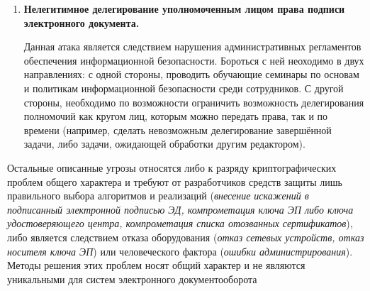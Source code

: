 \begin{enumerate} [label=\textbf{\arabic*}. ]
	\vspace{\baselineskip}
	В ещё более надёжной системе можно использовать асимметричные ключи, записанные на токены \cite{gpghowto, rutoken}. Такие ключи неизвлекаемы, для доступа к ним требуется физический доступ к их носителю --- токен злоумышленнику придётся украсть, а обнаружить пропажу физического ключа проще, чем электронного.

	\item \textbf{Нелегитимное делегирование уполномоченным лицом права подписи электронного документа.}

	\nopagebreak
	Данная атака является следствием нарушения административных регламентов обеспечения информационной безопасности. Бороться с ней неоходимо в двух направлениях: с одной стороны, проводить обучающие семинары по основам и политикам информационной безопасности среди сотрудников. С другой стороны, необходимо по возможности ограничить возможность делегирования полномочий как кругом лиц, которым можно передать права, так и по времени (например, сделать невозможным делегирование завершённой задачи, либо задачи, ожидающей обработки другим редактором).
\end{enumerate}

\vspace{\baselineskip}
Остальные описанные угрозы относятся либо к разряду криптографических проблем общего характера и требуют от разработчиков средств защиты лишь правильного выбора алгоритмов и реализаций (\textit{внесение искажений в подписанный электронной подписью ЭД, компрометация ключа ЭП либо ключа удостоверяющего центра, компрометация списка отозванных сертификатов}), либо является следствием отказа оборудования (\textit{отказ сетевых устройств, отказ носителя ключа ЭП}) или человеческого фактора (\textit{ошибки администрирования}). Методы решения этих проблем носят общий характер и не являются уникальными для систем электронного документооборота 